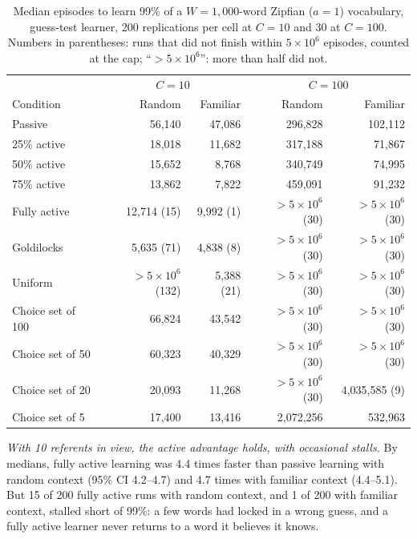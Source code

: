 \documentclass[a4paper,natbib,man]{apa6}
\begin{document}
\begin{table}[h]
\centering
\caption{\label{tab-modes-gt} Median episodes to learn 99\% of a $W=1{,}000$-word Zipfian ($a=1$) vocabulary, guess-test learner, 200 replications per cell at $C=10$ and 30 at $C=100$. Numbers in parentheses: runs that did not finish within $5 \times 10^6$ episodes, counted at the cap; ``$>5 \times 10^6$'': more than half did not.}
\small
\begin{tabular}{lrrrr}
\hline
 & \multicolumn{2}{c}{$C=10$} & \multicolumn{2}{c}{$C=100$} \\
Condition & Random & Familiar & Random & Familiar \\
\hline
Passive & 56{,}140 & 47{,}086 & 296{,}828 & 102{,}112 \\
25\% active & 18{,}018 & 11{,}682 & 317{,}188 & 71{,}867 \\
50\% active & 15{,}652 & 8{,}768 & 340{,}749 & 74{,}995 \\
75\% active & 13{,}862 & 7{,}822 & 459{,}091 & 91{,}232 \\
Fully active & 12{,}714 (15) & 9{,}992 (1) & $>5 \times 10^6$ (30) & $>5 \times 10^6$ (30) \\
Goldilocks & 5{,}635 (71) & 4{,}838 (8) & $>5 \times 10^6$ (30) & $>5 \times 10^6$ (30) \\
Uniform & $>5 \times 10^6$ (132) & 5{,}388 (21) & $>5 \times 10^6$ (30) & $>5 \times 10^6$ (30) \\
Choice set of 100 & 66{,}824 & 43{,}542 & $>5 \times 10^6$ (30) & $>5 \times 10^6$ (30) \\
Choice set of 50 & 60{,}323 & 40{,}329 & $>5 \times 10^6$ (30) & $>5 \times 10^6$ (30) \\
Choice set of 20 & 20{,}093 & 11{,}268 & $>5 \times 10^6$ (30) & 4{,}035{,}585 (9) \\
Choice set of 5 & 17{,}400 & 13{,}416 & 2{,}072{,}256 & 532{,}963 \\
\hline
\end{tabular}
\end{table}

\textit{With 10 referents in view, the active advantage holds, with occasional stalls.} By medians, fully active learning was 4.4 times faster than passive learning with random context (95\% CI 4.2--4.7) and 4.7 times with familiar context (4.4--5.1). But 15 of 200 fully active runs with random context, and 1 of 200 with familiar context, stalled short of 99\%: a few words had locked in a wrong guess, and a fully active learner never returns to a word it believes it knows.
\end{document}
